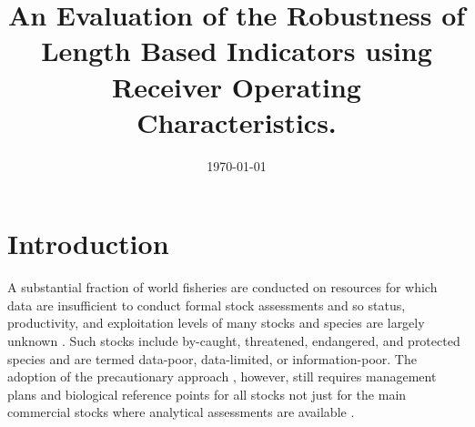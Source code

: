 \documentclass[12pt,doublespacing,a4paper]{ouparticle}
\begin{document}
\title{An Evaluation of the Robustness of Length Based Indicators using Receiver Operating Characteristics.}

\author{%
\address{Centre for Environmental Policy, Imperial College London, London SW7 1NE}
\and
{}
\address{GMIT}
\address{Marine Institute}
}

\abstract{
}

\date{\today}

\keywords{}
 
\maketitle

\newpage


\linenumbers
\linespread{2}


\section{Introduction}

A substantial fraction of world fisheries are conducted on resources for which data are insufficient to conduct formal stock assessments and so status, productivity, and exploitation levels of many stocks and species are largely unknown \citep{thorson2015introduction}. Such stocks include by-caught, threatened, endangered, and protected species and are termed data-poor, data-limited, or information-poor. The adoption of the precautionary approach \citep[PA,][]{garcia1996precautionary}, however, still requires management plans and biological reference points for all stocks not just for the main commercial stocks where analytical assessments are available \citep{sainsbury2003ref}. 
\end{document}
